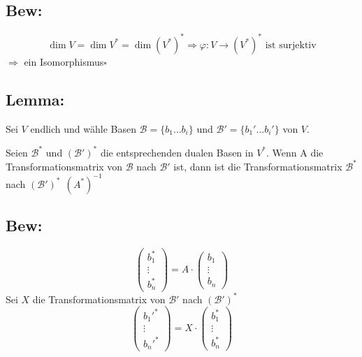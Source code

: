 \documentclass[titlepage,12pt,a4paper,ngerman]{report}
\newenvironment{bew}{\subsection{Bew:}}{\hfill$\square$}
\newcommand{\Bew}[1]{\begin{bew}#1\end{bew}}
\newcommand{\tx}[1]{\textrm{#1}}
\begin{document}
\Bew{ 
	$$\dim V = \dim V^* = \dim (V^*)^* \Rightarrow \varphi: V \to (V^*)^* \tx{ ist surjektiv} $$
	$\Rightarrow $ ein Isomorphismus}
\subsection{Lemma:}
Sei $V$ endlich und wähle Basen $\mathcal B = \{b_1 \dots b_i \}$ und $\mathcal B' = \{b_1' \dots b_i' \}$ von $V$.

Seien $ \mathcal{B}^* $ und $ (\mathcal{B}')^* $ die entsprechenden dualen Basen in $ V^* $. Wenn A die Transformationsmatrix von $ \mathcal{B} $ nach $ \mathcal{B}' $ ist, dann ist die Transformationsmatrix $ \mathcal{B^*} $ nach $ (\mathcal{B}')^* \ \ (A^*)^{-1}$
\subsection{Bew:}
$$\begin{pmatrix}
b^*_1\\
\vdots\\
b^*_n
\end{pmatrix} = A \cdot \begin{pmatrix}
b_1\\
\vdots\\
b_n
\end{pmatrix}$$
Sei $ X $ die Transformationsmatrix von $ \mathcal{B}' $ nach $ (\mathcal{B}') ^* $
$$\begin{pmatrix}
b_1'^*\\
\vdots\\
b_n'^*
\end{pmatrix} = X \cdot \begin{pmatrix}
b_1^*\\
\vdots\\
b_n^*
\end{pmatrix}$$
\end{document}
